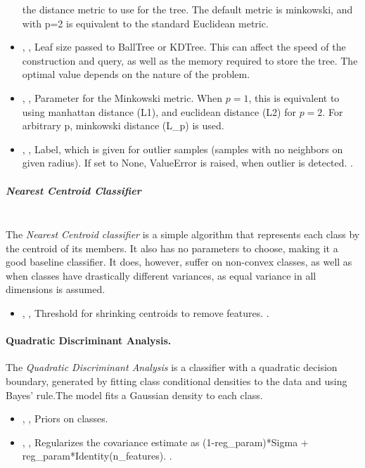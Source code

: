 \begin{itemize}
  the distance metric to use for the tree.
  The default metric is minkowski, and with p=2 is equivalent to the standard
  Euclidean metric.
  \item {} , ,
  Leaf size passed to BallTree or KDTree.
  This can affect the speed of the construction and query, as well as the memory
  required to store the tree.
  The optimal value depends on the nature of the problem.
  \item {} , ,
  Parameter for the Minkowski metric.
  When $p = 1$, this is equivalent to using manhattan distance (L1), and
  euclidean distance (L2) for $p = 2$.
  For arbitrary p, minkowski distance (L\_p) is used.
  \item {} , ,
  Label, which is given for outlier samples (samples with no neighbors on given
  radius).
  If set to None, ValueError is raised, when outlier is detected.
  .
\end{itemize}
\subparagraph{Nearest Centroid Classifier}
\mbox{}
\\The \textit{Nearest Centroid classifier} is a simple algorithm that represents
each class by the centroid of its members.
%
It also has no parameters to choose, making it a good baseline classifier.
%
It does, however, suffer on non-convex classes, as well as when classes have
drastically different variances, as equal variance in all dimensions is assumed.
%
\begin{itemize}
  \item {} , ,
  Threshold for shrinking centroids to remove features.
  .
\end{itemize}

\paragraph{Quadratic Discriminant Analysis.}
\label{QDA}
The \textit{Quadratic Discriminant Analysis} is a classifier with a quadratic
decision boundary, generated by fitting class conditional densities to the data
and using Bayes’ rule.The model fits a Gaussian density to each class.
%
\begin{itemize}
  \item {} , ,
  Priors on classes.
  \item {} , ,
  Regularizes the covariance estimate as (1-reg\_param)*Sigma +
  reg\_param*Identity(n\_features).
  .
\end{itemize}

